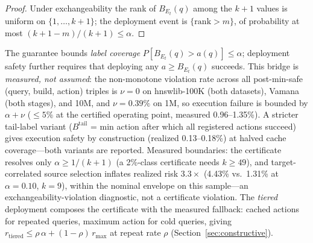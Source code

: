 \documentclass{article}
\begin{document}
\begin{proof}
Under exchangeability the rank of $B_{E_t}(q)$ among the $k{+}1$ values is uniform on
$\{1,\dots,k{+}1\}$; the deployment event is $\{\mathrm{rank}>m\}$, of probability at most
$(k{+}1-m)/(k{+}1)\le\alpha$.
\end{proof}

The guarantee bounds \emph{label coverage} $P[B_{E_t}(q)>a(q)]\le\alpha$; deployment safety further
requires that deploying any $a\ge B_{E_t}(q)$ succeeds. This bridge is \emph{measured, not assumed}: the
non-monotone violation rate across all post-min-safe (query, build, action) triples is
$\nu=0$ on hnswlib-100K (both datasets), Vamana (both stages), and 10M, and $\nu=0.39\%$ on 1M, so
execution failure is bounded by $\alpha+\nu$ ($\le5\%$ at the certified operating point, measured
0.96--1.35\%). A stricter tail-label variant ($B^{\mathrm{tail}}$ = min action after which all
registered actions succeed) gives execution safety by construction (realized 0.13--0.18\%) at halved
cache coverage---both variants are reported. Measured boundaries: the certificate resolves only
$\alpha\ge 1/(k+1)$ (a 2\%-class certificate needs $k\ge 49$), and target-correlated source selection
inflates realized risk $3.3\times$ (4.43\% vs.\ 1.31\% at $\alpha{=}0.10$, $k{=}9$), within the
nominal envelope on this sample---an exchangeability-violation diagnostic, not a certificate violation.
The \emph{tiered} deployment composes the certificate with the measured fallback: cached actions for
repeated queries, maximum action for cold queries, giving
$r_{\mathrm{tiered}}\le\rho\,\alpha+(1-\rho)\,r_{\max}$ at repeat rate $\rho$
(Section~\ref{sec:constructive}).
\end{document}
